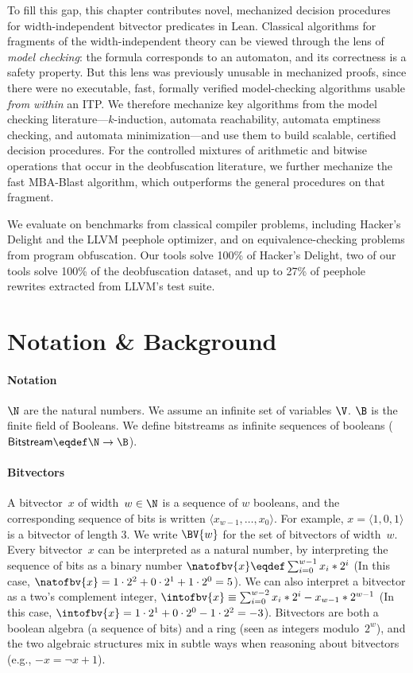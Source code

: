To fill this gap, this chapter contributes novel, mechanized decision
procedures for width-independent bitvector predicates in Lean. Classical
algorithms for fragments of the width-independent theory can be viewed
through the lens of \emph{model checking}: the formula corresponds to an
automaton, and its correctness is a safety property. But this lens was
previously unusable in mechanized proofs, since there were no executable,
fast, formally verified model-checking algorithms usable \emph{from within}
an ITP. We therefore mechanize key algorithms from the model checking
literature---$k$-induction, automata reachability, automata emptiness
checking, and automata minimization---and use them to build scalable,
certified decision procedures. For the controlled mixtures of arithmetic and
bitwise operations that occur in the deobfuscation literature, we further
mechanize the fast MBA-Blast algorithm, which outperforms the general
procedures on that fragment.

We evaluate on benchmarks from classical compiler problems, including
Hacker's Delight and the LLVM peephole optimizer, and on equivalence-checking
problems from program obfuscation. Our tools solve 100\% of Hacker's Delight,
two of our tools solve 100\% of the deobfuscation dataset, and up to 27\% of
peephole rewrites extracted from LLVM's test suite.

\section{Notation \& Background}
\label{sec:swbv:background}

\paragraph{Notation} $\N$ are the natural numbers. We assume an infinite set of variables $\V$.
$\B$ is the finite field of Booleans.
%
We define bitstreams as infinite sequences of booleans ($\bitstream \eqdef \N
\to \B$).

\paragraph{Bitvectors}
A bitvector~$x$ of width~$w \in \N$ is a sequence of $w$ booleans, and the
corresponding sequence of bits is written $\langle x_{w-1}, \ldots, x_0
\rangle$. For example, $x = \langle 1, 0, 1 \rangle$ is a bitvector of length 3.
%
We write $\BV{w}$ for the set of bitvectors of width~$w$.
%
Every bitvector~$x$ can be interpreted as a natural number, by interpreting the
sequence of bits as a binary number $\natofbv{x} \eqdef \sum_{i=0}^{w-1} x_i *
2^i$ (In this case, $\natofbv{x} = 1 \cdot 2^2 + 0 \cdot 2^1 + 1 \cdot 2^0 =
5$). We can also interpret a bitvector as a two's complement integer,
$\intofbv{x} \equiv \sum_{i=0}^{w-2} x_i * 2^i - x_{w-1} * 2^{w-1}$ (In this
case, $\intofbv{x} = 1 \cdot 2^1 + 0 \cdot 2^0 - 1 \cdot 2^2 = -3$). Bitvectors
are both a boolean algebra (a sequence of bits) and a ring (seen as integers
modulo~$2^w$), and the two algebraic structures mix in subtle ways when reasoning
about bitvectors (e.g., $-x = \lnot x + 1$).

